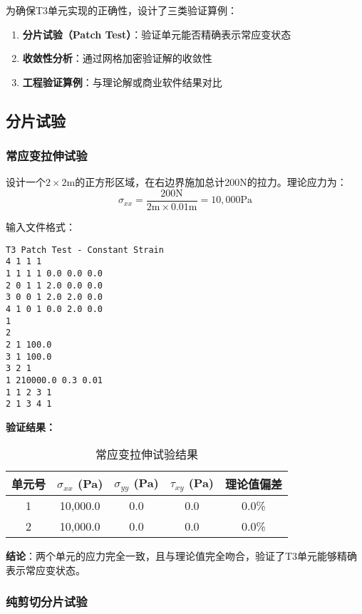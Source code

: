 \documentclass[12pt,a4paper]{article}
\begin{document}
为确保T3单元实现的正确性，设计了三类验证算例：

\begin{enumerate}
    \item \textbf{分片试验（Patch Test）}：验证单元能否精确表示常应变状态
    \item \textbf{收敛性分析}：通过网格加密验证解的收敛性
    \item \textbf{工程验证算例}：与理论解或商业软件结果对比
\end{enumerate}

\subsection{分片试验}

\subsubsection{常应变拉伸试验}

设计一个$2 \times 2$m的正方形区域，在右边界施加总计200N的拉力。理论应力为：
$$\sigma_{xx} = \frac{200\text{N}}{2\text{m} \times 0.01\text{m}} = 10,000 \text{Pa}$$

输入文件格式：
\begin{lstlisting}[caption=常应变拉伸试验输入文件]
T3 Patch Test - Constant Strain
4 1 1 1
1 1 1 1 0.0 0.0 0.0
2 0 1 1 2.0 0.0 0.0
3 0 0 1 2.0 2.0 0.0
4 1 0 1 0.0 2.0 0.0
1
2
2 1 100.0
3 1 100.0
3 2 1
1 210000.0 0.3 0.01
1 1 2 3 1
2 1 3 4 1
\end{lstlisting}

\textbf{验证结果：}

\begin{table}[H]
\centering
\caption{常应变拉伸试验结果}
\begin{tabular}{ccccc}
\toprule
单元号 & $\sigma_{xx}$ (Pa) & $\sigma_{yy}$ (Pa) & $\tau_{xy}$ (Pa) & 理论值偏差 \\
\midrule
1 & 10,000.0 & 0.0 & 0.0 & 0.0\% \\
2 & 10,000.0 & 0.0 & 0.0 & 0.0\% \\
\bottomrule
\end{tabular}
\end{table}

\textbf{结论}：两个单元的应力完全一致，且与理论值完全吻合，验证了T3单元能够精确表示常应变状态。

\subsubsection{纯剪切分片试验}
\end{document}

